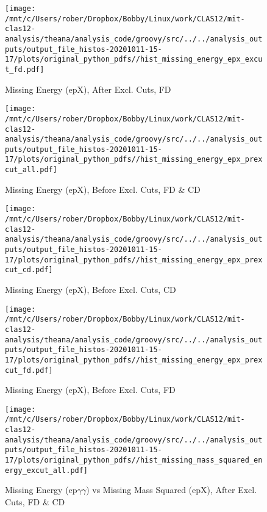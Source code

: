 \documentclass{article}
\begin{document}
\begin{landscape}
\begin{figure}[h]
        \texttt{[image: /mnt/c/Users/rober/Dropbox/Bobby/Linux/work/CLAS12/mit-clas12-analysis/theana/analysis\_code/groovy/src/../../analysis\_outputs/output\_file\_histos-20201011-15-17/plots/original\_python\_pdfs//hist\_missing\_energy\_epx\_excut\_fd.pdf]}
        \captionsetup{textformat=empty,labelformat=blank}
        \caption{Missing Energy (epX), After Excl. Cuts, FD}
    \end{figure}
    \clearpage
    
    \begin{figure}[h]
        \centering

        \texttt{[image: /mnt/c/Users/rober/Dropbox/Bobby/Linux/work/CLAS12/mit-clas12-analysis/theana/analysis\_code/groovy/src/../../analysis\_outputs/output\_file\_histos-20201011-15-17/plots/original\_python\_pdfs//hist\_missing\_energy\_epx\_prexcut\_all.pdf]}
        \captionsetup{textformat=empty,labelformat=blank}
        \caption{Missing Energy (epX), Before Excl. Cuts, FD \& CD}
    \end{figure}
    \clearpage
    
    \begin{figure}[h]
        \centering

        \texttt{[image: /mnt/c/Users/rober/Dropbox/Bobby/Linux/work/CLAS12/mit-clas12-analysis/theana/analysis\_code/groovy/src/../../analysis\_outputs/output\_file\_histos-20201011-15-17/plots/original\_python\_pdfs//hist\_missing\_energy\_epx\_prexcut\_cd.pdf]}
        \captionsetup{textformat=empty,labelformat=blank}
        \caption{Missing Energy (epX), Before Excl. Cuts, CD}
    \end{figure}
    \clearpage
    
    \begin{figure}[h]
        \centering

        \texttt{[image: /mnt/c/Users/rober/Dropbox/Bobby/Linux/work/CLAS12/mit-clas12-analysis/theana/analysis\_code/groovy/src/../../analysis\_outputs/output\_file\_histos-20201011-15-17/plots/original\_python\_pdfs//hist\_missing\_energy\_epx\_prexcut\_fd.pdf]}
        \captionsetup{textformat=empty,labelformat=blank}
        \caption{Missing Energy (epX), Before Excl. Cuts, FD}
    \end{figure}
    \clearpage
    
    \begin{figure}[h]
        \centering

        \texttt{[image: /mnt/c/Users/rober/Dropbox/Bobby/Linux/work/CLAS12/mit-clas12-analysis/theana/analysis\_code/groovy/src/../../analysis\_outputs/output\_file\_histos-20201011-15-17/plots/original\_python\_pdfs//hist\_missing\_mass\_squared\_energy\_excut\_all.pdf]}
        \captionsetup{textformat=empty,labelformat=blank}
        \caption{Missing Energy (ep$\gamma$$\gamma$) vs Missing Mass Squared (epX), After Excl. Cuts, FD \& CD}
    \end{figure}
    \clearpage
    

\end{landscape}
\end{document}
